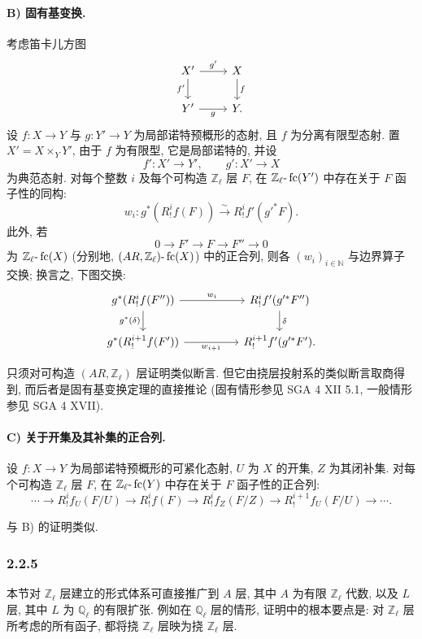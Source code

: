 \paragraph{B) 固有基变换.}
考虑笛卡儿方图
\[
\begin{tikzcd}
X' \arrow[r,"g'"] \arrow[d,"f'"'] & X \arrow[d,"f"]\\
Y' \arrow[r,"g"'] & Y .
\end{tikzcd}
\]
设 \(f:X\to Y\) 与 \(g:Y'\to Y\) 为局部诺特预概形的态射, 且 \(f\) 为分离有限型态射. 置 \(X'=X\times_Y Y'\), 由于 \(f\) 为有限型, 它是局部诺特的, 并设
\[
f':X'\to Y',\qquad g':X'\to X
\]
为典范态射. 对每个整数 \(i\) 及每个可构造 \(\mathbb Z_\ell\) 层 \(F\), 在 \(\mathbb Z_\ell\text{-}\operatorname{fc}(Y')\) 中存在关于 \(F\) 函子性的同构:
\[
w_i:g^*(R^i_!f(F))\xrightarrow{\sim} R^i_!f'(g'^*F).
\]
此外, 若
\[
0\longrightarrow F'\longrightarrow F\longrightarrow F''\longrightarrow 0
\]
为 \(\mathbb Z_\ell\text{-}\operatorname{fc}(X)\) (分别地, \((AR,\mathbb Z_\ell)\text{-}\operatorname{fc}(X)\)) 中的正合列, 则各 \((w_i)_{i\in\mathbb N}\) 与边界算子交换; 换言之, 下图交换:
\[
\begin{tikzcd}[column sep=huge]
g^*(R^i_!f(F'')) \arrow[r,"w_i"] \arrow[d,"g^*(\delta)"']
&
R^i_!f'(g'^*F'') \arrow[d,"\delta"]\\
g^*(R^{i+1}_!f(F')) \arrow[r,"w_{i+1}"']
&
R^{i+1}_!f'(g'^*F').
\end{tikzcd}
\]

\begin{prooftext}[证明]
只须对可构造 \((AR,\mathbb Z_\ell)\) 层证明类似断言. 但它由挠层投射系的类似断言取商得到, 而后者是固有基变换定理的直接推论 (固有情形参见 SGA 4 XII 5.1, 一般情形参见 SGA 4 XVII).
\end{prooftext}

\paragraph{C) 关于开集及其补集的正合列.}
设 \(f:X\to Y\) 为局部诺特预概形的可紧化态射, \(U\) 为 \(X\) 的开集, \(Z\) 为其闭补集. 对每个可构造 \(\mathbb Z_\ell\) 层 \(F\), 在 \(\mathbb Z_\ell\text{-}\operatorname{fc}(Y)\) 中存在关于 \(F\) 函子性的正合列:
\[
\cdots\longrightarrow R^i_!f_U(F/U)
\longrightarrow R^i_!f(F)
\longrightarrow R^i_!f_Z(F/Z)
\longrightarrow R^{i+1}_!f_U(F/U)
\longrightarrow\cdots .
\]

\begin{prooftext}[证明]
与 B) 的证明类似.
\end{prooftext}

\subsubsection*{2.2.5}
本节对 \(\mathbb Z_\ell\) 层建立的形式体系可直接推广到 \(A\) 层, 其中 \(A\) 为有限 \(\mathbb Z_\ell\) 代数, 以及 \(L\) 层, 其中 \(L\) 为 \(\mathbb Q_\ell\) 的有限扩张. 例如在 \(\mathbb Q_\ell\) 层的情形, 证明中的根本要点是: 对 \(\mathbb Z_\ell\) 层所考虑的所有函子, 都将挠 \(\mathbb Z_\ell\) 层映为挠 \(\mathbb Z_\ell\) 层.

